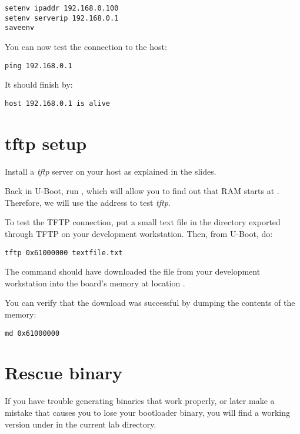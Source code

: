 \begin{verbatim}
setenv ipaddr 192.168.0.100
setenv serverip 192.168.0.1
saveenv
\end{verbatim}

You can now test the connection to the host:
\begin{verbatim}
ping 192.168.0.1
\end{verbatim}

It should finish by:
\begin{verbatim}
host 192.168.0.1 is alive
\end{verbatim}

\section{tftp setup}

Install a {\em tftp} server on your host as explained in the slides.

Back in U-Boot, run , which will allow you to find out that
RAM starts at . Therefore, we will use the 
address to test {\em tftp}.

To test the TFTP connection, put a small text file in
the directory exported through TFTP on your development
workstation. Then, from U-Boot, do:

\begin{verbatim}
tftp 0x61000000 textfile.txt
\end{verbatim}

The  command should have downloaded the
 file from your development workstation into
the board's memory at location .

You can verify that the download was successful by dumping the
contents of the memory:

\begin{verbatim}
md 0x61000000
\end{verbatim}

\section{Rescue binary}

If you have trouble generating binaries that work properly, or later
make a mistake that causes you to lose your bootloader binary, you
will find a working version under  in the current lab
directory.

